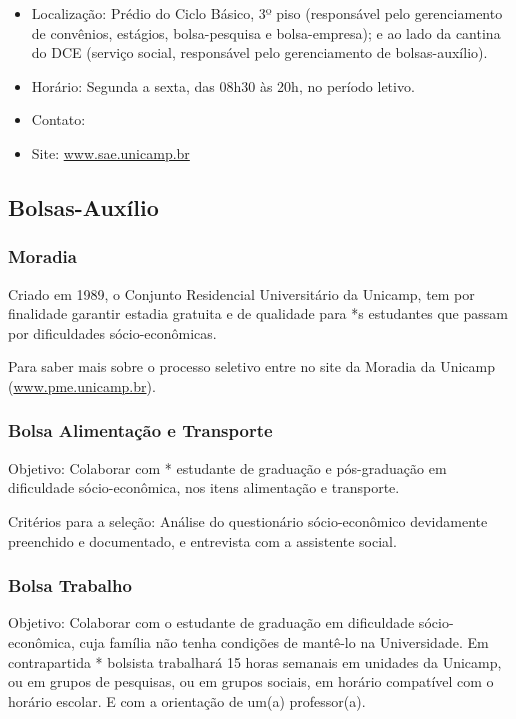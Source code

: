 \begin{itemize}
    \item  Localização: Prédio do Ciclo Básico, 3º piso (responsável pelo
        gerenciamento de convênios, estágios, bolsa-pesquisa e bolsa-empresa);
        e ao lado da cantina do DCE (serviço social, responsável pelo
        gerenciamento de bolsas-auxílio).
    \item  Horário: Segunda a sexta, das 08h30 às 20h, no período letivo.
    \item  Contato: 
    \item  Site: \url{www.sae.unicamp.br}
\end{itemize}

\subsection{Bolsas-Auxílio}
\subsubsection{Moradia}

Criado em 1989, o Conjunto Residencial Universitário da Unicamp, tem por
finalidade garantir estadia gratuita e de qualidade para *s estudantes que
passam por dificuldades sócio-econômicas.

Para saber mais sobre o processo seletivo entre no site da Moradia da Unicamp
(\url{www.pme.unicamp.br}).

\subsubsection{Bolsa Alimentação e Transporte}

Objetivo: Colaborar com * estudante de graduação e pós-graduação em dificuldade
sócio-econômica, nos itens alimentação e transporte.

Critérios para a seleção: Análise do questionário sócio-econômico devidamente
preenchido e documentado, e entrevista com a assistente social.

\subsubsection{Bolsa Trabalho}

Objetivo: Colaborar com o estudante de graduação em dificuldade
sócio-econômica, cuja família não tenha condições de mantê-lo na Universidade.
Em contrapartida * bolsista trabalhará 15 horas semanais em unidades da
Unicamp, ou em grupos de pesquisas, ou em grupos sociais, em horário compatível
com o horário escolar. E com a orientação de um(a) professor(a).


